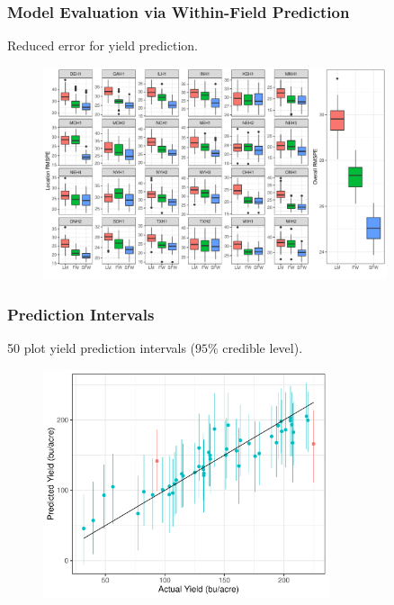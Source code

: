 \documentclass{beamer}
\begin{document}
\begin{frame}
	\frametitle{Model Evaluation via Within-Field Prediction}
	Reduced error for yield prediction.
	\begin{figure}[H]
		\centering
		\includegraphics[width = 0.9\textwidth]{com_pred3.pdf}
	\end{figure}
\end{frame}





\begin{frame}
	\frametitle{Prediction Intervals}
	50 plot yield prediction intervals ($95\%$ credible level).
	\begin{figure}[H]
		\centering
		\includegraphics[width = 0.75\textwidth]{true_vs_predint.pdf}
	\end{figure}
\end{frame}
\end{document}
